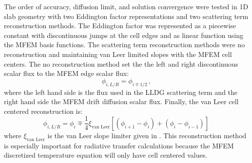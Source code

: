 
The order of accuracy, diffusion limit, and solution convergence were tested in 1D slab geometry with two Eddington factor representations and two scattering term reconstruction methods. The Eddington factor was represented as a piecewise constant with discontinuous jumps at the cell edges and as linear function using the MFEM basis functions. The scattering term reconstruction methods were no reconstruction and maintaining van Leer limited slopes with the MFEM cell centers. The no reconstruction method set the the left and right discontinuous scalar flux to the MFEM edge scalar flux:
	\begin{equation} 
		\phi_{i,L/R} = \phi_{i\mp1/2} \,,
	\end{equation}
where the left hand side is the flux used in the LLDG scattering term and the right hand side the MFEM drift diffusion scalar flux. 
Finally, the van Leer cell centered reconstruction is: 
	\begin{equation} \label{eq:vanLeer}
		\phi_{i,L/R} = \phi_i \mp \frac{1}{4} \xi_\text{van Leer} \left[ \left(\phi_{i+1} - \phi_{i}\right) + 
			\left(\phi_{i} - \phi_{i-1}\right)\right] \,
	\end{equation}
where $\xi_\text{van Leer}$ is the van Leer slope limiter given in \cite{}. This reconstruction method is especially important for radiative transfer calculations because the MFEM discretized temperature equation will only have cell centered values. 

